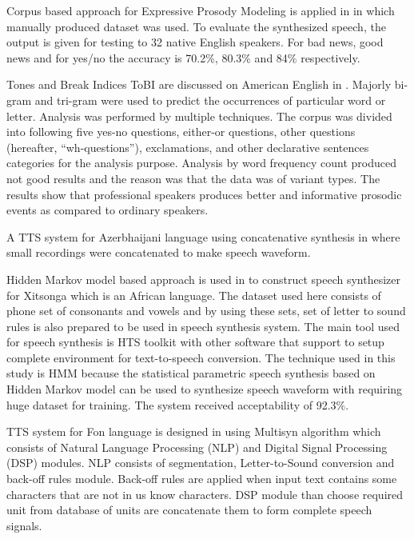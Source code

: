 Corpus based approach for Expressive Prosody Modeling is applied in \cite{eide2004corpus} in which
manually produced dataset was used. To evaluate the synthesized
speech, the output is given for testing to 32 native English speakers. For bad news, good news and
for yes/no the accuracy is 70.2\%, 80.3\% and 84\% respectively.


Tones and Break Indices ToBI are discussed on American English in \cite{pitrelli2004tobi}. Majorly
bi-gram and tri-gram were used to predict the occurrences of particular word or letter. Analysis
was performed by multiple techniques. The corpus was divided into following five yes-no
questions, either-or questions, other questions (hereafter, “wh-questions”), exclamations, and other
declarative sentences categories for the analysis purpose. Analysis by word frequency count
produced not good results and the reason was that the data was of variant types. The results show
that professional speakers produces better and informative prosodic events as compared to
ordinary speakers.

A TTS system for Azerbhaijani language using concatenative
synthesis in \cite{aida2010main} where small recordings were concatenated to make speech waveform.


Hidden Markov model based approach is used in \cite{baloyi2012text} to construct
speech synthesizer for Xitsonga which is an African language. The dataset used here consists of phone
set of consonants and vowels and by using these sets, set of letter to sound rules is also prepared to be used in speech synthesis system. The main tool used for speech synthesis is HTS toolkit with other software that support to setup complete environment for text-to-speech conversion.
The technique used in this study is HMM because the statistical parametric speech synthesis based on Hidden Markov model
can be used to synthesize speech waveform with requiring huge dataset for training. The system received acceptability
of 92.3\%. 


TTS system for Fon language is designed in \cite{dagba2014text} using Multisyn algorithm
which consists of Natural Language Processing (NLP) and Digital Signal Processing (DSP)
modules. NLP consists of segmentation, Letter-to-Sound conversion and back-off rules module.
Back-off rules are applied when input text contains some characters that are not in us know
characters. DSP module than choose required unit from database of units are concatenate them to
form complete speech signals.


